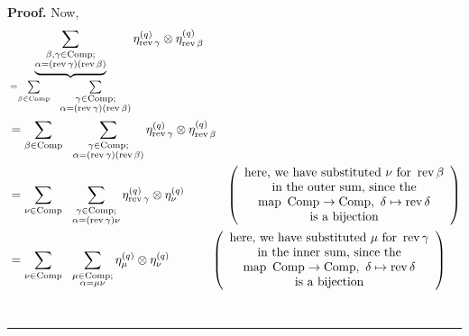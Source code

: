 \documentclass[numbers=enddot,12pt,final,onecolumn,notitlepage]{scrartcl}%
\theoremstyle{definition}
\newenvironment{proof}[1][Proof]{\noindent\textbf{#1.} }{\ \rule{0.5em}{0.5em}}
\let\sumnonlimits\sum
\renewcommand{\sum}{\sumnonlimits\limits}
\newenvironment{verlong}{}{}
\begin{document}
\begin{verlong}
\begin{proof}
Now,%
\begin{align*}
&  \underbrace{\sum_{\substack{\beta,\gamma\in\operatorname*{Comp}%
;\\\alpha=\left(  \operatorname*{rev}\gamma\right)  \left(
\operatorname*{rev}\beta\right)  }}}_{=\sum_{\beta\in\operatorname*{Comp}%
}\ \ \sum_{\substack{\gamma\in\operatorname*{Comp};\\\alpha=\left(
\operatorname*{rev}\gamma\right)  \left(  \operatorname*{rev}\beta\right)  }%
}}\eta_{\operatorname*{rev}\gamma}^{\left(  q\right)  }\otimes\eta
_{\operatorname*{rev}\beta}^{\left(  q\right)  }\\
&  =\sum_{\beta\in\operatorname*{Comp}}\ \ \sum_{\substack{\gamma
\in\operatorname*{Comp};\\\alpha=\left(  \operatorname*{rev}\gamma\right)
\left(  \operatorname*{rev}\beta\right)  }}\eta_{\operatorname*{rev}\gamma
}^{\left(  q\right)  }\otimes\eta_{\operatorname*{rev}\beta}^{\left(
q\right)  }\\
&  =\sum_{\nu\in\operatorname*{Comp}}\ \ \sum_{\substack{\gamma\in
\operatorname*{Comp};\\\alpha=\left(  \operatorname*{rev}\gamma\right)  \nu
}}\eta_{\operatorname*{rev}\gamma}^{\left(  q\right)  }\otimes\eta_{\nu
}^{\left(  q\right)  }\ \ \ \ \ \ \ \ \ \ \left(
\begin{array}
[c]{c}%
\text{here, we have substituted }\nu\text{ for }\operatorname*{rev}\beta\\
\text{in the outer sum, since the}\\
\text{map }\operatorname*{Comp}\rightarrow\operatorname*{Comp},\ \delta
\mapsto\operatorname*{rev}\delta\\
\text{is a bijection}%
\end{array}
\right) \\
&  =\sum_{\nu\in\operatorname*{Comp}}\ \ \sum_{\substack{\mu\in
\operatorname*{Comp};\\\alpha=\mu\nu}}\eta_{\mu}^{\left(  q\right)  }%
\otimes\eta_{\nu}^{\left(  q\right)  }\ \ \ \ \ \ \ \ \ \ \left(
\begin{array}
[c]{c}%
\text{here, we have substituted }\mu\text{ for }\operatorname*{rev}\gamma\\
\text{in the inner sum, since the}\\
\text{map }\operatorname*{Comp}\rightarrow\operatorname*{Comp},\ \delta
\mapsto\operatorname*{rev}\delta\\
\text{is a bijection}%
\end{array}
\right) \\

\end{align*}
\end{proof}
\end{verlong}
\end{document}
